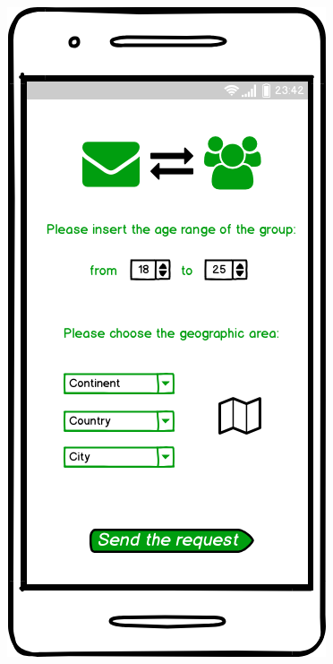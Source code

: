 \documentclass{article}
\begin{document}
\begin{legal}
\begin{legal}
\begin{legal}
\begin{legal}
\begin{figure}[H]
  						\includegraphics[scale=0.3]{./images/mockups/Group-request.png}
						\end{figure}
				\end{legal}
			\end{legal}


\end{legal}
\end{legal}
\end{document}
